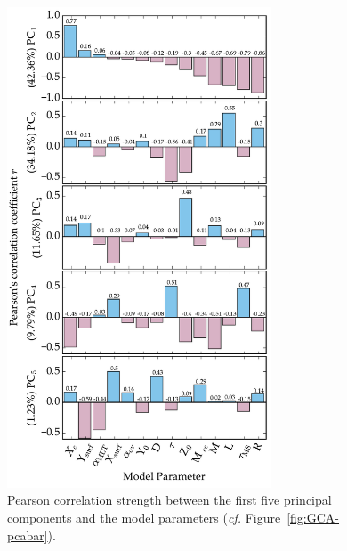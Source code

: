 \begin{figure} \centering
\includegraphics[width=0.7\textwidth]{barchart3a.pdf}%
\caption[Correlation between principal components and model parameters]{ Pearson correlation strength between the first five principal components and the model parameters (\emph{cf.} Figure~\ref{fig:GCA-pcabar}). }
\label{fig:GCA-pcabarb}
\end{figure}



